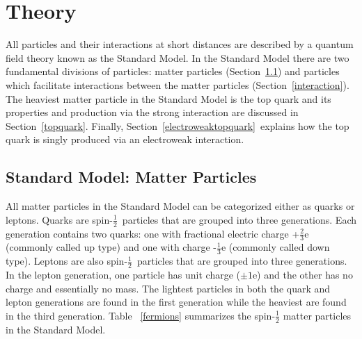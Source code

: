 \chapter{Theory} 
\label{Theory}
\label{theory}

All particles and their interactions at short distances are described by a quantum field theory known as the Standard Model. In the Standard Model there are two fundamental divisions of particles: matter particles (Section~\ref{matter}) and particles which facilitate interactions between the matter particles (Section~\ref{interaction}). The heaviest matter particle in the Standard Model is the top quark and its properties and production via the strong interaction are discussed in Section~\ref{topquark}. Finally, Section~\ref{electroweaktopquark}~explains how the top quark is singly produced via an electroweak interaction.


\section{Standard Model: Matter Particles}
\label{matter}

All matter particles in the Standard Model can be categorized either as quarks or leptons. Quarks are spin-$\frac{1}{2}$~particles that are grouped into three generations. Each generation contains two quarks: one with fractional electric charge +$\frac{2}{3}$e (commonly called up type) and one with charge -$\frac{1}{3}$e (commonly called down type). Leptons are also spin-$\frac{1}{2}$~particles that are grouped into three generations. In the lepton generation, one particle has unit charge ($\pm1$e) and the other has no charge and essentially no mass. The lightest particles in both the quark and lepton generations are found in the first generation while the heaviest are found in the third generation. Table ~\ref{fermions} summarizes the spin-$\frac{1}{2}$ matter particles in the Standard Model.


